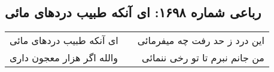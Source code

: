 \begin{center}
\section*{رباعی شماره ۱۶۹۸: ای آنکه طبیب دردهای مائی}
\label{sec:1698}
\begin{longtable}{l p{0.5cm} r}
ای آنکه طبیب دردهای مائی
&&
این درد ز حد رفت چه میفرمائی
\\
والله اگر هزار معجون داری
&&
من جانم نبرم تا تو رخی ننمائی
\\
\end{longtable}
\end{center}
